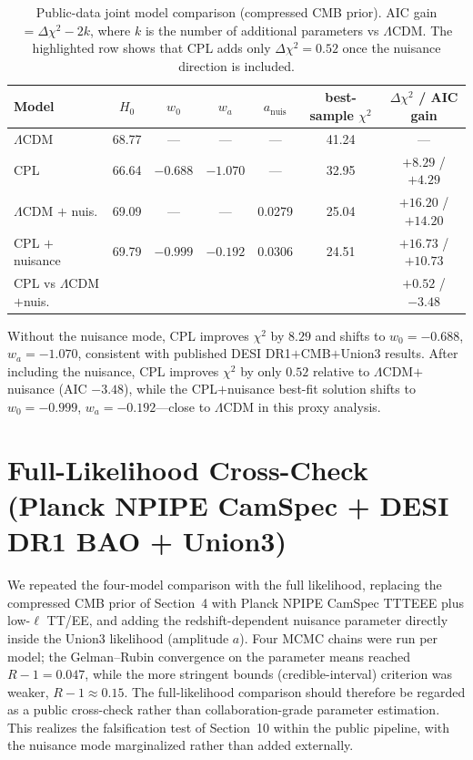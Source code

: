 \documentclass[11pt]{article}
\begin{document}
\begin{table}[h]
\centering
\caption{Public-data joint model comparison (compressed CMB prior). AIC gain
$=\Delta\chi^2-2k$, where $k$ is the number of additional parameters vs $\Lambda$CDM.
The highlighted row shows that CPL adds only $\Delta\chi^2=0.52$ once the nuisance
direction is included.}
\label{tab:proxy}
\begin{tabular}{lcccccc}
\toprule
Model & $H_0$ & $w_0$ & $w_a$ & $a_\mathrm{nuis}$ & best-sample $\chi^2$ & $\Delta\chi^2$ / AIC gain \\
\midrule
$\Lambda$CDM            & 68.77 & ---     & ---     & ---    & 41.24 & --- \\
CPL                     & 66.64 & $-0.688$ & $-1.070$ & ---   & 32.95 & $+8.29$ / $+4.29$ \\
$\Lambda$CDM $+$ nuis.  & 69.09 & ---     & ---     & 0.0279 & 25.04 & $+16.20$ / $+14.20$ \\
CPL $+$ nuisance        & 69.79 & $-0.999$ & $-0.192$ & 0.0306 & 24.51 & $+16.73$ / $+10.73$ \\
\midrule
CPL vs $\Lambda$CDM$+$nuis. & & & & & & $+0.52$ / $-3.48$ \\
\bottomrule
\end{tabular}
\end{table}

Without the nuisance mode, CPL improves $\chi^2$ by $8.29$ and shifts to $w_0=-0.688$,
$w_a=-1.070$, consistent with published DESI DR1$+$CMB$+$Union3 results. After including
the nuisance, CPL improves $\chi^2$ by only $0.52$ relative to $\Lambda$CDM$+$nuisance
(AIC $-3.48$), while the CPL$+$nuisance best-fit solution shifts to $w_0=-0.999$, $w_a=-0.192$---close
to $\Lambda$CDM in this proxy analysis.

\section{Full-Likelihood Cross-Check (Planck NPIPE CamSpec + DESI DR1 BAO + Union3)}
\label{sec:fullplanck}

We repeated the four-model comparison with the full likelihood, replacing the
compressed CMB prior of Section~4 with Planck NPIPE CamSpec TTTEEE plus low-$\ell$
TT/EE, and adding the redshift-dependent nuisance parameter directly inside the Union3
likelihood (amplitude $a$). Four MCMC chains were run per model; the Gelman--Rubin
convergence on the parameter means reached $R-1=0.047$, while the more stringent
bounds (credible-interval) criterion was weaker, $R-1\approx0.15$. The full-likelihood
comparison should therefore be regarded as a public cross-check rather than
collaboration-grade parameter estimation. This realizes the falsification test of
Section~10 within the public pipeline, with the nuisance mode marginalized rather
than added externally.
\end{document}
